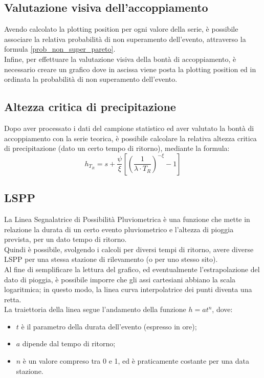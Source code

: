 \subsection{Valutazione visiva dell'accoppiamento}
Avendo calcolato la plotting position per ogni valore della serie, è possibile associare la relativa probabilità di non superamento dell'evento, attraverso la formula \ref{prob_non_super_pareto}.\\
Infine, per effettuare la valutazione visiva della bontà di accoppiamento, è necessario creare un grafico dove in ascissa viene posta la plotting position ed in ordinata la probabilità di non superamento dell'evento.


\subsection{Altezza critica di precipitazione}
Dopo aver processato i dati del campione statistico ed aver valutato la bontà di accoppiamento con la serie teorica, è possibile calcolare la relativa altezza critica di precipitazione (dato un certo tempo di ritorno), mediante la formula:
\begin{equation}
    h_{T_R} = s + \frac{\psi}{\xi} \left[ \left(\frac{1}{\lambda \cdot T_R} \right) ^{-\xi} - 1 \right]
    \label{h_critica_tr}
\end{equation}

\subsection{LSPP}
La Linea Segnalatrice di Possibilità Pluviometrica è una funzione che mette in relazione la durata di un certo evento pluviometrico e l'altezza di pioggia prevista, per un dato tempo di ritorno.\\
Quindi è possibile, svolgendo i calcoli per diversi tempi di ritorno, avere diverse LSPP per una stessa stazione di rilevamento (o per uno stesso sito).\\
Al fine di semplificare la lettura del grafico, ed eventualmente l'estrapolazione del dato di pioggia, è possibile imporre che gli assi cartesiani abbiano la scala logaritmica; in questo modo, la linea curva interpolatrice dei punti diventa una retta.\\
La traiettoria della linea segue l'andamento della funzione $h=at^n$, dove:
\begin{itemize}
\item $t$ è il parametro della durata dell'evento (espresso in ore);
\item $a$ dipende dal tempo di ritorno;    
\item $n$ è un valore compreso tra 0 e 1, ed è praticamente costante per una data stazione.
\end{itemize}

